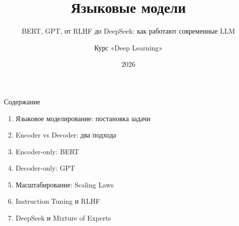 \documentclass[aspectratio=169, 8pt]{beamer}
\title{Языковые модели}
\subtitle{BERT, GPT, от RLHF до DeepSeek: как работают современные LLM}
\author{Курс «Deep Learning»}
\date{2026}
\begin{document}
\begin{frame}
  \titlepage
\end{frame}

\begin{frame}{Содержание}
  \begin{enumerate}
    \item Языковое моделирование: постановка задачи
    \item Encoder vs Decoder: два подхода
    \item Encoder-only: BERT
    \item Decoder-only: GPT
    \item Масштабирование: Scaling Laws
    \item Instruction Tuning и RLHF
    \item DeepSeek и Mixture of Experts
  \end{enumerate}
\end{frame}
\end{document}
